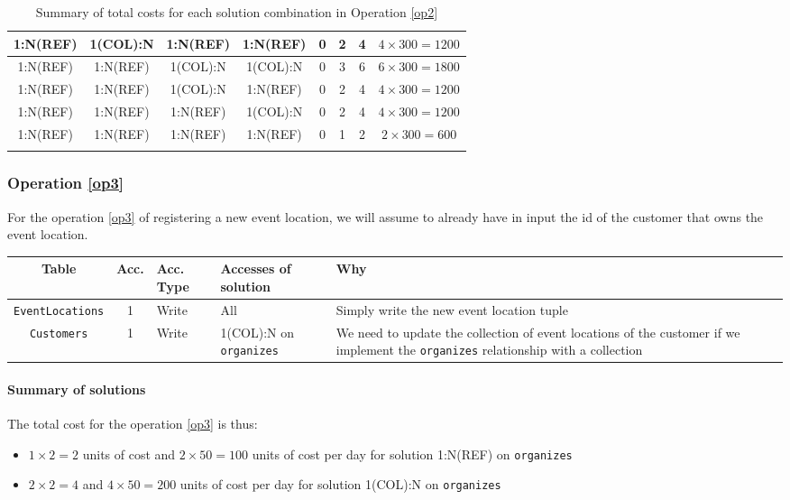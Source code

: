 \begin{longtable}[H]{|c|c|c|c|c|c|c|c|}
    \hline
    1:N(REF) & 1(COL):N & 1:N(REF) & 1:N(REF) & 0 & 2 & 4 & $4 \times 300 = 1200 $ \\
    \hline
    1:N(REF) & 1:N(REF) & 1(COL):N & 1(COL):N & 0 & 3 & 6 & $6 \times 300 = 1800 $ \\
    \hline
    1:N(REF) & 1:N(REF) & 1(COL):N & 1:N(REF) & 0 & 2 & 4 & $4 \times 300 = 1200 $ \\
    \hline
    1:N(REF) & 1:N(REF) & 1:N(REF) & 1(COL):N & 0 & 2 & 4 & $4 \times 300 = 1200 $ \\
    \hline
    1:N(REF) & 1:N(REF) & 1:N(REF) & 1:N(REF) & 0 & 1 & 2 & $2 \times 300 = 600 $ \\
    \hline
    \caption{Summary of total costs for each solution combination in Operation \ref{op2}}
    \label{tab:op2-summary}
\end{longtable}

\subsubsection{Operation \ref{op3}}

For the operation \ref{op3} of registering a new event location, we will assume to already have in input the id of the customer that owns the event location.

\begin{longtable}[H]{|c|c|p{1cm}|p{2cm}|p{8cm}|}
    \hline
    \textbf{Table} & \textbf{Acc.} & \textbf{Acc. Type} & \textbf{Accesses of solution} & \textbf{Why} \\
    \hline
    \texttt{EventLocations} & 1 & Write & All & Simply write the new event location tuple \\
    \hline
    \texttt{Customers} & 1 & Write & 1(COL):N on \texttt{organizes} & We need to update the collection of event locations of the customer if we implement the \texttt{organizes} relationship with a collection \\
    \hline
\end{longtable}

\paragraph{Summary of solutions}

The total cost for the operation \ref{op3} is thus:
\begin{itemize}
    \item $1 \times 2 = 2$ units of cost and $2 \times 50 = 100$ units of cost per day for solution 1:N(REF) on \texttt{organizes}
    \item $2 \times 2 = 4$ and $4 \times 50 = 200$ units of cost per day for solution 1(COL):N on \texttt{organizes}
\end{itemize}

